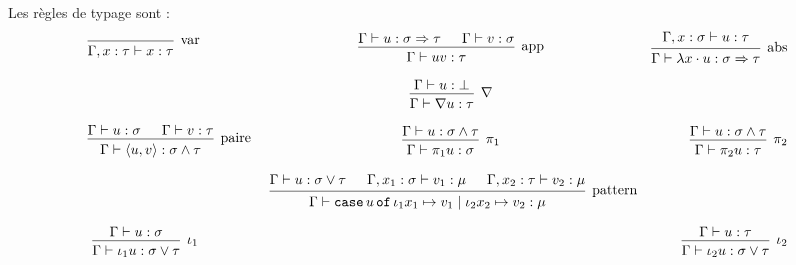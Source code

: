 \documentclass[a4paper]{article}
\begin{document}
Les règles de typage sont :
\[ \begin{array}{lcr}
\text{\begin{prooftree}
\infer0[var]{\Gamma, x : \tau \vdash x : \tau}
\end{prooftree}} &
\text{\begin{prooftree}
\hypo{\Gamma \vdash u : \sigma \Rightarrow \tau}
\hypo{\Gamma \vdash v : \sigma}
\infer2[app]{\Gamma \vdash uv : \tau}
\end{prooftree}} &
\text{\begin{prooftree}
\hypo{\Gamma, x : \sigma \vdash u : \tau}
\infer1[abs]{\Gamma \vdash \lambda x \cdot u : \sigma \Rightarrow \tau}
\end{prooftree}} \\
& & \\
&
\text{\begin{prooftree}
\hypo{\Gamma \vdash u : \bot}
\infer1[$\nabla$]{\Gamma \vdash \nabla u : \tau}
\end{prooftree}} & \\
& & \\
\text{\begin{prooftree}
\hypo{\Gamma \vdash u : \sigma}
\hypo{\Gamma \vdash v : \tau}
\infer2[paire]{\Gamma \vdash \langle u, v \rangle : \sigma \wedge \tau}
\end{prooftree}} &
\text{\begin{prooftree}
\hypo{\Gamma \vdash u : \sigma \wedge \tau}
\infer1[$\pi_1$]{\Gamma \vdash \pi_1 u : \sigma}
\end{prooftree}} &
\text{\begin{prooftree}
\hypo{\Gamma \vdash u : \sigma \wedge \tau}
\infer1[$\pi_2$]{\Gamma \vdash \pi_2 u : \tau}
\end{prooftree}}\\
& & \\
&
\text{
\begin{prooftree}
\hypo{\Gamma \vdash u : \sigma \vee \tau}
\hypo{\Gamma, x_1 : \sigma \vdash v_1 : \mu}
\hypo{\Gamma, x_2 : \tau \vdash v_2 : \mu}
\infer3[pattern]{\Gamma \vdash \mathtt{case} \, u \, \mathtt{of} \, \iota_1 x_1 \mapsto v_1 \; | \; \iota_2 x_2 \mapsto v_2 : \mu}
\end{prooftree}} & \\
& & \\
\text{
\begin{prooftree}
\hypo{\Gamma \vdash u : \sigma}
\infer1[$\iota_1$]{\Gamma \vdash \iota_1 u : \sigma \vee \tau}
\end{prooftree}} & &
\text{
\begin{prooftree}
\hypo{\Gamma \vdash u : \tau}
\infer1[$\iota_2$]{\Gamma \vdash \iota_2 u : \sigma \vee \tau}
\end{prooftree}}
\end{array} \]
\end{document}
